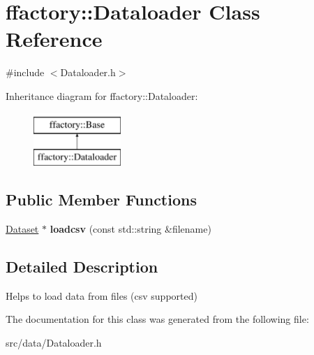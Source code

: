 \hypertarget{classffactory_1_1_dataloader}{\section{ffactory\-:\-:Dataloader Class Reference}
\label{classffactory_1_1_dataloader}
}


{\ttfamily \#include $<$Dataloader.\-h$>$}

Inheritance diagram for ffactory\-:\-:Dataloader\-:\begin{figure}[H]
\begin{center}
\leavevmode
\includegraphics[height=2.000000cm]{classffactory_1_1_dataloader}
\end{center}
\end{figure}
\subsection*{Public Member Functions}
\begin{DoxyCompactItemize}
\item 
\hypertarget{classffactory_1_1_dataloader_a0d89666fe5253f6f9cfa205d7cf1855a}{\hyperlink{classffactory_1_1_dataset}{Dataset} $\ast$ {\bfseries loadcsv} (const std\-::string \&filename)}\label{classffactory_1_1_dataloader_a0d89666fe5253f6f9cfa205d7cf1855a}

\end{DoxyCompactItemize}


\subsection{Detailed Description}
Helps to load data from files (csv supported) 

The documentation for this class was generated from the following file\-:\begin{DoxyCompactItemize}
\item 
src/data/Dataloader.\-h\end{DoxyCompactItemize}
